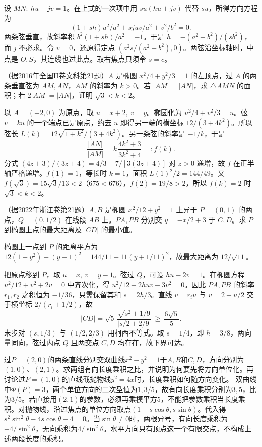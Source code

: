 设 \(MN:\ hu+jv=1\)。在上式的一次项中用 \(su(hu+jv)\) 代替 \(su\)，所得方向方程为
\[
 (1+sh)u^2/a^2+sjuv/a^2+v^2/b^2=0 .
\]
两条弦垂直，故斜率积 \(b^2(1+sh)/a^2=-1\)。于是 \(h=-(a^2+b^2)/(sb^2)\)，而 \(j\) 不必求。令 \(v=0\)，还原得定点 \((a^2s/(a^2+b^2),0)\)。两弦沿坐标轴时，中点是 \(O,S\)，其连线也过此点。取右焦点只须令 \(s=c\)。


（据2016年全国II卷文科第21题）\(A\) 是椭圆 \(x^2/4+y^2/3=1\) 的左顶点，过 \(A\) 的两条垂直弦为 \(AM,AN\)，\(AM\) 的斜率为 \(k>0\)。若 \(|AM|=|AN|\)，求 \(\triangle AMN\) 的面积；若 \(2|AM|=|AN|\)，证明 \(\sqrt3<k<2\)。
\par
\solutionanswer
以 \(A=(-2,0)\) 为原点，取 \(u=x+2,\ v=y\)。椭圆化为 \(u^2/4+v^2/3=u\)。弦 \(v=ku\) 的一个端点已是原点，约去 \(u\) 即得另一端的横坐标 \(12/(3+4k^2)\)。所以弦长 \(L(k)=12\sqrt{1+k^2}/(3+4k^2)\)。另一条弦的斜率是 \(-1/k\)，于是
\[
 \frac{|AN|}{|AM|}=k\,\frac{4k^2+3}{3k^2+4}=:f(k).
\]
分式 \((4z+3)/(3z+4)=4/3-7/[3(3z+4)]\) 对 \(z>0\) 递增，故 \(f\) 在正半轴严格递增。\(f(1)=1\)，等长时 \(k=1\)，面积 \(L(1)^2/2=144/49\)。又 \(f(\sqrt3)=15\sqrt3/13<2\)（\(675<676\)），\(f(2)=19/8>2\)，所以 \(f(k)=2\) 时 \(\sqrt3<k<2\)。


（据2022年浙江卷第21题）\(A,B\) 是椭圆 \(x^2/12+y^2=1\) 上异于 \(P=(0,1)\) 的两点，\(Q=(0,1/2)\) 在线段 \(AB\) 上。\(PA,PB\) 分别交 \(y=-x/2+3\) 于 \(C,D\)。求 \(P\) 到椭圆上点的最大距离及 \(|CD|\) 的最小值。
\par
\solutionanswer
椭圆上一点到 \(P\) 的距离平方为 \(12(1-y^2)+(y-1)^2=144/11-11(y+1/11)^2\)，故最大距离为 \(12/\sqrt{11}\)。

把原点移到 \(P\)，取 \(u=x,\ v=y-1\)。弦过 \(Q\)，可设 \(hu-2v=1\)。在椭圆方程 \(u^2/12+v^2+2v=0\) 中齐次化，得 \(u^2/12+2huv-3v^2=0\)。因此 \(PA,PB\) 的斜率 \(r_1,r_2\) 之积恒为 \(-1/36\)，只需保留其和 \(s=2h/3\)。直线 \(v=r_i u\) 与 \(v=2-u/2\) 交于横坐标 \(2/(r_i+1/2)\)，故
\[
 |CD|=\sqrt5\,\frac{\sqrt{s^2+1/9}}{|s/2+2/9|}
 \ \ge\ \frac{6\sqrt5}{5}.
\]
末步对 \((s,1/3)\) 与 \((1/2,2/3)\) 用柯西不等式。取 \(s=1/4\)，即 \(h=3/8\)，两向量同向，弦过内点 \(Q\) 且两交点 \(C,D\) 均存在，故下界可达。


过\(P=(2,0)\)的两条直线分别交双曲线\(x^2-y^2=1\)于\(A,B\)和\(C,D\)，方向分别为\((1,0)\)、\((2,1)\)。求两组有向长度乘积之比，并说明为何要先将方向单位化。再讨论过\(P=(1,0)\)的直线截抛物线\(y^2=4x\)时，长度乘积如何随方向变化。
\solutionanswer
双曲线中\(\Phi(P)=3\)，两个单位方向的二次型值为\(1,3/5\)，故有向长度乘积分别为\(3,5\)，比为\(3/5\)。若直接用\((2,1)\)的参数，必须再乘模平方\(5\)，不能把参数乘积当长度乘积。对抛物线，沿过焦点的单位方向取点\((1+s\cos\theta,s\sin\theta)\)。代入得\(s^2\sin^2\theta-4s\cos\theta-4=0\)。当\(\sin\theta\ne0\)时，两根异号，有向长度乘积为\(-4/\sin^2\theta\)，无向乘积为\(4/\sin^2\theta\)。水平方向只有顶点这一个有限交点，不构成上述两段长度的乘积。


